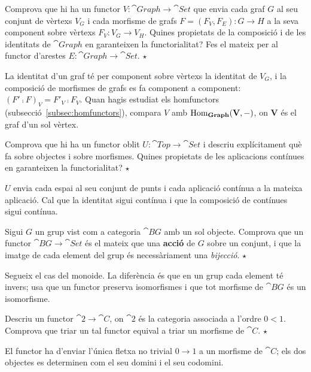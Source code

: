 \begin{exercici}
Comprova que hi ha un functor $V\colon\cat{Graph}\to\cat{Set}$ que envia cada graf $G$ al seu conjunt de vèrtexs $V_G$ i cada morfisme de grafs $F=(F_V,F_E)\colon G\to H$ a la seva component sobre vèrtexs $F_V\colon V_G\to V_H$. Quines propietats de la composició i de les identitats de $\cat{Graph}$ en garanteixen la functorialitat? Fes el mateix per al functor d'arestes $E\colon\cat{Graph}\to\cat{Set}$. \hfill{\normalfont$\star$}
\begin{indicacio}
La identitat d'un graf té per component sobre vèrtexs la identitat de $V_G$, i la composició de morfismes de grafs es fa component a component: $(F'\comp F)_V=F'_V\comp F_V$. Quan hagis estudiat els homfunctors (subsecció~\ref{subsec:homfunctors}), compara $V$ amb $\operatorname{Hom}_{\mathbf{Graph}}(\mathbf V,-)$, on $\mathbf V$ és el graf d'un sol vèrtex.
\end{indicacio}
\end{exercici}

\begin{exercici}
Comprova que hi ha un functor oblit $U\colon\cat{Top}\to\cat{Set}$ i descriu explícitament què fa sobre objectes i sobre morfismes. Quines propietats de les aplicacions contínues en garanteixen la functorialitat? \hfill{\normalfont$\star$}
\begin{indicacio}
$U$ envia cada espai al seu conjunt de punts i cada aplicació contínua a la mateixa aplicació. Cal que la identitat sigui contínua i que la composició de contínues sigui contínua.
\end{indicacio}
\end{exercici}

\begin{exercici}
Sigui $G$ un grup vist com a categoria $\cat{B}G$ amb un sol objecte. Comprova que un functor $\cat{B}G\to\cat{Set}$ és el mateix que una \textbf{acció} de $G$ sobre un conjunt, i que la imatge de cada element del grup és necessàriament una \emph{bijecció}. \hfill{\normalfont$\star$}
\begin{indicacio}
Segueix el cas del monoide. La diferència és que en un grup cada element té invers; usa que un functor preserva isomorfismes i que tot morfisme de $\cat{B}G$ és un isomorfisme.
\end{indicacio}
\end{exercici}

\begin{exercici}
Descriu un functor $\cat{2}\to\cat{C}$, on $\cat{2}$ és la categoria associada a l'ordre $0<1$. Comprova que triar un tal functor equival a triar un morfisme de $\cat{C}$. \hfill{\normalfont$\star$}
\begin{indicacio}
El functor ha d'enviar l'única fletxa no trivial $0\to1$ a un morfisme de $\cat{C}$; els dos objectes es determinen com el seu domini i el seu codomini.
\end{indicacio}
\end{exercici}

